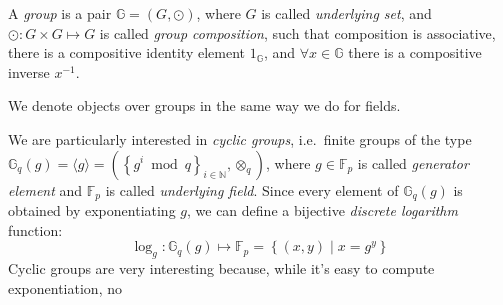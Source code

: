 \begin{definition}
	A \emph{group} is a pair \(\mathbb{G} = \left(G, \odot\right)\), where \(G\) is called
	\emph{underlying set}, and \(\odot\colon G \times G \mapsto G\) is called \emph{group composition},
	such that composition is associative, there is a compositive identity element \(1_{\mathbb{G}}\), and
	\(\forall x \in \mathbb{G}\) there is a compositive inverse \(x^{-1}\).
\end{definition}

\noindent We denote objects over groups in the same way we do for fields.
\begin{comment}
We can define \emph{group exponentiation} following the natural definition:
\[\forall x \in \mathbb{G}, \forall n \in \mathbb{N}\colon x^n = \bigodot^{n}{x}\]

Any group \(\mathbb{G}\) for which \(\left|\mathbb{G}\right| \in \mathbb{N}\) is a \emph{finite group}.
We can build a finite group from a \emph{generator} set \(S\) and a composition operation
\(\odot \) by closing \(S\) under \(\odot \):
\begin{align*}
	 & {\left\langle{S}\right\rangle}^i =
	\begin{cases}
		S                                            & i = 0
		\\
		{\left\langle{S}\right\rangle}^{i-1} \cup \left\{x \odot y \mid x,y \in
		{\left\langle{S}\right\rangle}^{i-1}\right\} & i > 0
		\\
	\end{cases}
	\\
	 & \mathbb{G} = \left\langle{S}\right\rangle =
	\left(\min_{i}{{\left\langle{S}\right\rangle}^{i}} \mid
	{\left\langle{S}\right\rangle}^{i} = {\left\langle{S}\right\rangle}^{i-1}, \odot\right)
\end{align*}
\end{comment}
We are particularly interested in \emph{cyclic groups}, i.e.\ finite groups of the type
\(\mathbb{G}_q\left(g\right) = \langle{g}\rangle = \left({\left\{g^i \bmod q\right\}}_{i \in
	\mathbb{N}}, \otimes_q\right)\), where \(g \in \mathbb{F}_p\) is called \emph{generator element}
and \(\mathbb{F}_p\) is called \emph{underlying field}.
Since every element of \(\mathbb{G}_q\left(g\right)\) is obtained by exponentiating \(g\), we can
define a bijective \emph{discrete logarithm} function:
\[
	\log_g\colon \mathbb{G}_q\left(g\right) \mapsto \mathbb{F}_p =
	\left\{\left(x, y\right) \mid x = g^y\right\}
\]
Cyclic groups are very interesting because, while it's easy to compute exponentiation, no
